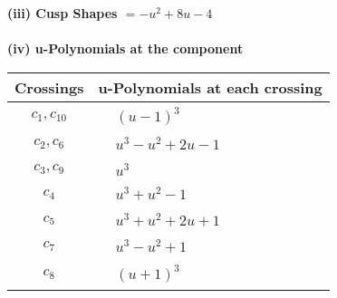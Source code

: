 \documentclass[1p]{elsarticle_modified}
\theoremstyle{definition}
\begin{document}
\flushleft \textbf{(iii) Cusp Shapes $= - u^2+8 u-4$}\\~\\
\newpage\renewcommand{\arraystretch}{1}
\flushleft \textbf{(iv) u-Polynomials at the component}\newline \\
\begin{tabular}{m{50pt}|m{274pt}}
Crossings & \hspace{64pt}u-Polynomials at each crossing \\
\hline $$\begin{aligned}c_{1},c_{10}\end{aligned}$$&$\begin{aligned}
&(u-1)^3
\end{aligned}$\\
\hline $$\begin{aligned}c_{2},c_{6}\end{aligned}$$&$\begin{aligned}
&u^3- u^2+2 u-1
\end{aligned}$\\
\hline $$\begin{aligned}c_{3},c_{9}\end{aligned}$$&$\begin{aligned}
&u^3
\end{aligned}$\\
\hline $$\begin{aligned}c_{4}\end{aligned}$$&$\begin{aligned}
&u^3+u^2-1
\end{aligned}$\\
\hline $$\begin{aligned}c_{5}\end{aligned}$$&$\begin{aligned}
&u^3+u^2+2 u+1
\end{aligned}$\\
\hline $$\begin{aligned}c_{7}\end{aligned}$$&$\begin{aligned}
&u^3- u^2+1
\end{aligned}$\\
\hline $$\begin{aligned}c_{8}\end{aligned}$$&$\begin{aligned}
&(u+1)^3
\end{aligned}$\\
\hline
\end{tabular}\\~\\
\end{document}
